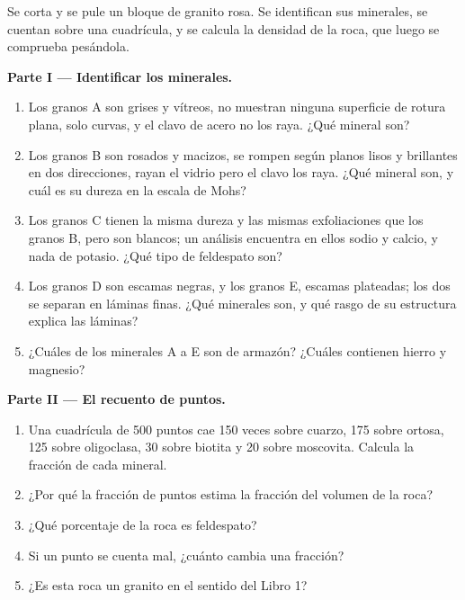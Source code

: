\begin{problem}
\label{pb:g11:minerals:1}
Se corta y se pule un bloque de granito rosa. Se identifican sus minerales, se
cuentan sobre una cuadrícula, y se calcula la densidad de la roca, que luego
se comprueba pesándola.

\medskip
\noindent\textbf{Parte I --- Identificar los minerales.}
\begin{enumerate}
  \item Los granos A son grises y vítreos, no muestran ninguna superficie de
        rotura plana, solo curvas, y el clavo de acero no los raya. ¿Qué
        mineral son?
  \item Los granos B son rosados y macizos, se rompen según planos lisos y
        brillantes en dos direcciones, rayan el vidrio pero el clavo los raya.
        ¿Qué mineral son, y cuál es su dureza en la escala de Mohs?
  \item Los granos C tienen la misma dureza y las mismas exfoliaciones que los
        granos B, pero son blancos; un análisis encuentra en ellos sodio y
        calcio, y nada de potasio. ¿Qué tipo de feldespato son?
  \item Los granos D son escamas negras, y los granos E, escamas plateadas;
        los dos se separan en láminas finas. ¿Qué minerales son, y qué rasgo
        de su estructura explica las láminas?
  \item ¿Cuáles de los minerales A a E son  de armazón? ¿Cuáles
        contienen hierro y magnesio?
\end{enumerate}

\medskip
\noindent\textbf{Parte II --- El recuento de puntos.}
\begin{enumerate}[resume]
  \item Una cuadrícula de 500 puntos cae 150 veces sobre cuarzo, 175 sobre
        ortosa, 125 sobre oligoclasa, 30 sobre biotita y 20 sobre
        moscovita. Calcula la fracción de cada mineral.
  \item ¿Por qué la fracción de puntos estima la fracción del volumen de la
        roca?
  \item ¿Qué porcentaje de la roca es feldespato?
  \item Si un punto se cuenta mal, ¿cuánto cambia una fracción?
  \item ¿Es esta roca un granito en el sentido del Libro 1?
\end{enumerate}


\end{problem}
